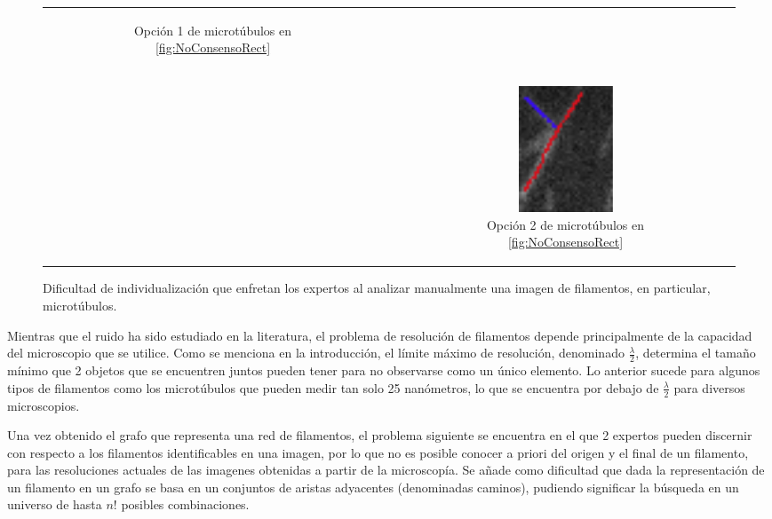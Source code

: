 \begin{figure}[h]
\begin{tabular}{c c c}
\begin{subfigure}[t]{0.21\textwidth}
        \caption{Opci\'on 1 de microt\'ubulos en \ref{fig:NoConsensoRect}}
        \label{fig:NoConsensoOpcion1}
        \end{subfigure} \\
        & &
        \begin{subfigure}[b]{0.21\textwidth}
        \includegraphics[scale=0.8]{imagenes/NoConsenso4.png}
        \caption{Opci\'on 2 de microt\'ubulos en \ref{fig:NoConsensoRect}}
        \label{fig:NoConsensoOpcion2}
        \end{subfigure} \\
    \end{tabular}
    
    \caption{Dificultad de individualizaci\'on que enfretan los expertos al analizar manualmente una imagen de filamentos, en particular, microt\'ubulos.}
    \label{fig:NoConsenso}
\end{figure}

Mientras que el ruido ha sido estudiado en la literatura, el problema de resoluci\'on de filamentos depende principalmente de la capacidad del microscopio que se utilice. Como se menciona en la introducci\'on, el l\'imite m\'aximo de resoluci\'on, denominado $\frac{\lambda}{2}$, determina el tama\~no m\'inimo que 2 objetos que se encuentren juntos pueden tener para no observarse como un \'unico elemento. Lo anterior sucede para algunos tipos de filamentos como los microt\'ubulos que pueden medir tan solo 25 nan\'ometros, lo que se encuentra por debajo de $\frac{\lambda}{2}$ para diversos microscopios. 



Una vez obtenido el grafo que representa una red de filamentos, el problema siguiente se encuentra en el que 2 expertos pueden discernir con respecto a los filamentos identificables en una imagen, por lo que no es posible conocer a priori del origen y el final de un filamento, para las resoluciones actuales de las imagenes obtenidas a partir de la microscop\'ia. Se añade como dificultad que dada la representaci\'on de un filamento en un grafo se basa en un conjuntos de aristas adyacentes (denominadas caminos), pudiendo significar la b\'usqueda en un universo de hasta $n!$ posibles combinaciones.

